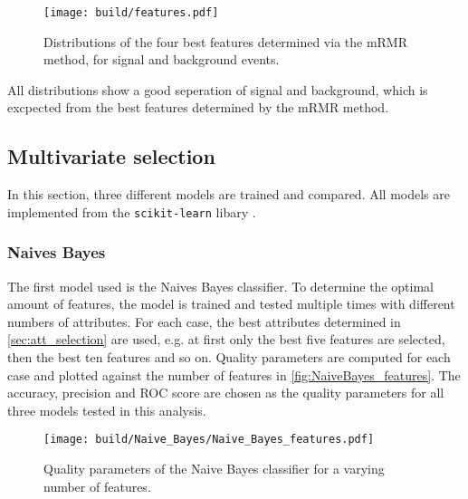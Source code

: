 \begin{figure}[H]
  \centering
  \texttt{[image: build/features.pdf]}
  \caption{Distributions of the four best features determined via the mRMR method, for signal and background events.}
  \label{fig:features}
\end{figure}

All distributions show a good seperation of signal and background, which is excpected
from the best features determined by the mRMR method.

\subsection{Multivariate selection}

In this section, three different models are trained and compared. All models are implemented from the \texttt{scikit-learn}
libary \cite{scikit-learn}.

\subsubsection{Naives Bayes}

The first model used is the Naives Bayes classifier. To determine the optimal amount of
features, the model is trained and tested multiple times with different numbers of attributes.
For each case, the best attributes determined in \autoref{sec:att_selection} are used, e.g. at first 
only the best five features are selected, then the best ten features and so on.
Quality parameters are computed for each case and plotted against the number of features in \autoref{fig:NaiveBayes_features}.
The accuracy, precision and ROC score are chosen as the quality parameters for all three
models tested in this analysis.

\begin{figure}[H]
  \centering
  \texttt{[image: build/Naive\_Bayes/Naive\_Bayes\_features.pdf]}
  \caption{Quality parameters of the Naive Bayes classifier for a varying number of features.}
  \label{fig:NaiveBayes_features}
\end{figure}


